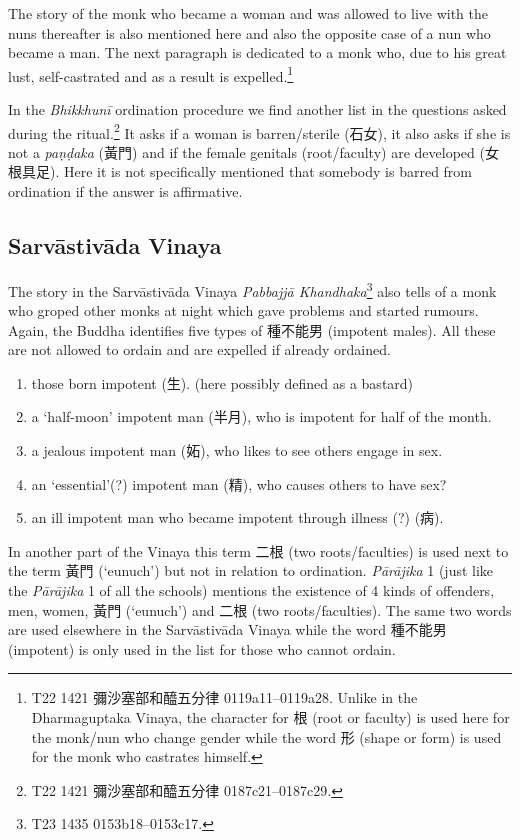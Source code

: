 The story of the monk who became a woman and was allowed to live with the nuns thereafter is also mentioned here and also the opposite case of a nun who became a man. The next paragraph is dedicated to a monk who, due to his great lust, self-castrated and as a result is expelled.\footnote{T22 1421 彌沙塞部和醯五分律 0119a11–0119a28. Unlike in the Dharmaguptaka Vinaya, the character for 根 (root or faculty) is used here for the monk/nun who change gender while the word 形 (shape or form) is used for the monk who castrates himself.} 

In the {\em Bhikkhunī} ordination procedure we find another list in the questions asked during the ritual.\footnote{T22 1421 彌沙塞部和醯五分律 0187c21–0187c29.} It asks if a woman is barren/sterile (石女), it also asks if she is not a {\em paṇḍaka} (黃門) and if the female genitals (root/faculty) are developed (女根具足). Here it is not specifically mentioned that somebody is barred from ordination if the answer is affirmative.

\subsection{Sarvāstivāda Vinaya}
The story in the Sarvāstivāda Vinaya {\em Pabbajjā Khandhaka}\footnote{T23 1435 0153b18–0153c17.} also tells of a monk who groped other monks at night which gave problems and started rumours. Again, the Buddha identifies five types of 種不能男 (impotent males). All these are not allowed to ordain and are expelled if already ordained.

\begin{enumerate}
\item those born impotent (生). (here possibly defined as a bastard)
\item a `half-moon' impotent man (半月), who is impotent for half of the month.
\item a jealous impotent man (妬), who likes to see others engage in sex.
\item an `essential'(?) impotent man (精), who causes others to have sex?
\item an ill impotent man who became impotent through illness (?) (病).
\end{enumerate}

In another part of the Vinaya this term 二根 (two roots/faculties) is used next to the term 黃門 (`eunuch') but not in relation to ordination. {\em Pārājika} 1 (just like the {\em Pārājika} 1 of all the schools) mentions the existence of 4 kinds of offenders, men, women, 黃門 (`eunuch') and 二根 (two roots/faculties). The same two words are used elsewhere in the Sarvāstivāda Vinaya while the word 種不能男 (impotent) is only used in the list for those who cannot ordain.

